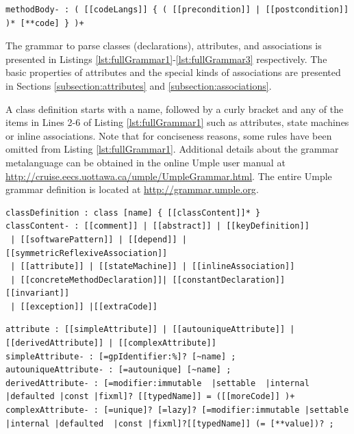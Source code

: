 \begin{lstlisting}[language={grammar}, label=lst:grammarExtra,caption=Grammar for Umple classes]
methodBody- : ( [[codeLangs]] { ( [[precondition]] | [[postcondition]] )* [**code] } )+
\end{lstlisting}

The grammar to parse classes (declarations), attributes, and associations is presented in Listings \ref{lst:fullGrammar1}-\ref{lst:fullGrammar3} respectively. The basic properties of attributes and the special kinds of associations are presented in Sections \ref{subsection:attributes} and \ref{subsection:associations}.

A class definition starts with a name, followed by a curly bracket and any of the items in Lines 2-6 of Listing \ref{lst:fullGrammar1} such as attributes, state machines or inline associations. Note that for conciseness reasons, some rules have been omitted from Listing \ref{lst:fullGrammar1}. Additional details about the grammar metalanguage can be obtained in the online Umple user manual at \url{http://cruise.eecs.uottawa.ca/umple/UmpleGrammar.html}. The entire Umple grammar definition is located at \url{http://grammar.umple.org}.


\begin{lstlisting}[language={grammar}, label=lst:fullGrammar1,caption=Umple grammar for classes]
classDefinition : class [name] { [[classContent]]* }
classContent- : [[comment]] | [[abstract]] | [[keyDefinition]] 
 | [[softwarePattern]] | [[depend]] | [[symmetricReflexiveAssociation]]
 | [[attribute]] | [[stateMachine]] | [[inlineAssociation]] 
 | [[concreteMethodDeclaration]]| [[constantDeclaration]] [[invariant]] 
 | [[exception]] |[[extraCode]]
\end{lstlisting}

\begin{lstlisting}[language={grammar}, label=lst:fullGrammar2,caption=Umple grammar for attributes]
attribute : [[simpleAttribute]] | [[autouniqueAttribute]] | [[derivedAttribute]] | [[complexAttribute]]
simpleAttribute- : [=gpIdentifier:%]? [~name] ;
autouniqueAttribute- : [=autounique] [~name] ;
derivedAttribute- : [=modifier:immutable  |settable  |internal |defaulted |const |fixml]? [[typedName]] = ([[moreCode]] )+
complexAttribute- : [=unique]? [=lazy]? [=modifier:immutable |settable |internal |defaulted  |const |fixml]?[[typedName]] (= [**value])? ;
\end{lstlisting}

